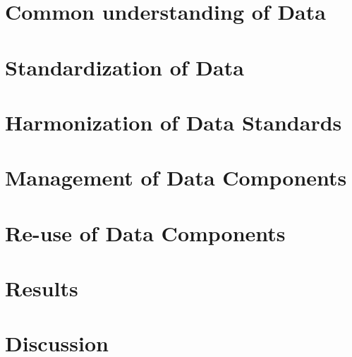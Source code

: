 \documentclass{llncs}
\begin{document}
\section{Common understanding of Data}


\section{Standardization of Data}


\section{Harmonization of Data Standards}


\section{Management of Data Components}


\section{Re-use of Data Components}

\section{Results}

\section{Discussion}

 


\newpage




\end{document}
